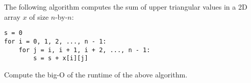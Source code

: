 The following algorithm
computes the sum of upper triangular 
values in a 2D array $x$ of size 
$n$-by-$n$:
\begin{Verbatim}[frame=single, fontsize=\small]
s = 0
for i = 0, 1, 2, ..., n - 1:
    for j = i, i + 1, i + 2, ..., n - 1:
        s = s + x[i][j]
\end{Verbatim}
Compute the big-O of the runtime of the above algorithm.
